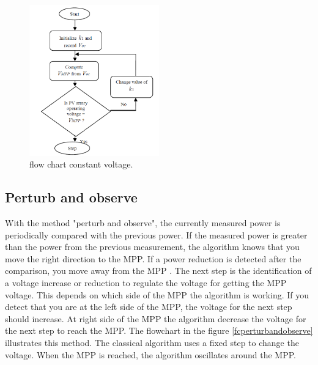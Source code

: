 \begin{figure}[htbp]
	\begin{center}
		\includegraphics[width=0.5\textwidth]{../Pictures/P1/Flow_chart/Flow_chart_constant_voltage}
		\caption{flow chart constant voltage\cite{flowchartVC}. }
		\label{fcconstantvoltage}
	\end{center}	
\end{figure}

\subsection{Perturb and observe}
With the method "perturb and observe", the currently measured power is periodically compared with the previous power. If the measured power is greater than the power from the previous measurement, the algorithm knows that you move the right direction to the MPP. If a power reduction is detected after the comparison, you move away from the MPP . The next step is the identification of a voltage increase or reduction to regulate the voltage for getting the MPP voltage. This depends on which side of the MPP the algorithm is working. If you detect that you are at the left side of the MPP, the voltage for the next step should increase. At right side of the MPP the algorithm decrease the voltage for the next step to reach the MPP.
The flowchart in the figure \ref{fcperturbandobserve} illustrates this method. The classical algorithm uses a fixed step to change the voltage. When the MPP is reached, the algorithm oscillates around the MPP\cite{flowchartVC}. 

